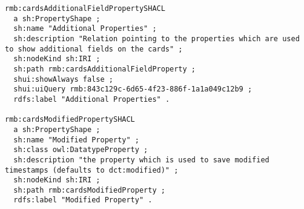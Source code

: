 \begin{spacing}{0.9}
\begin{lstlisting}
rmb:cardsAdditionalFieldPropertySHACL
  a sh:PropertyShape ;
  sh:name "Additional Properties" ;
  sh:description "Relation pointing to the properties which are used to show additional fields on the cards" ;
  sh:nodeKind sh:IRI ;
  sh:path rmb:cardsAdditionalFieldProperty ;
  shui:showAlways false ;
  shui:uiQuery rmb:843c129c-6d65-4f23-886f-1a1a049c12b9 ;
  rdfs:label "Additional Properties" .

rmb:cardsModifiedPropertySHACL
  a sh:PropertyShape ;
  sh:name "Modified Property" ;
  sh:class owl:DatatypeProperty ;
  sh:description "the property which is used to save modified timestamps (defaults to dct:modified)" ;
  sh:nodeKind sh:IRI ;
  sh:path rmb:cardsModifiedProperty ;
  rdfs:label "Modified Property" .
\end{lstlisting}
\end{spacing}




